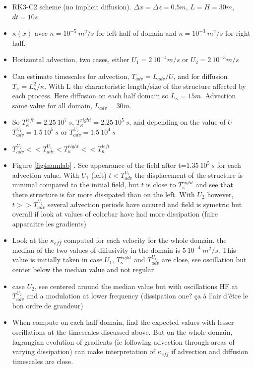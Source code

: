 \begin{itemize}
\item RK3-C2 scheme (no implicit diffusion). $\Delta x = \Delta z = 0.5m$, $L = H = 30m$, $dt=10s$
\item $\kappa(x)$ avec $\kappa = 10^{-5} \ m^2/s$ for left half of domain and $\kappa = 10^{-3} \ m^2/s$ for right half. 
\item Horizontal advection, two cases, either $U_1=2 \ 10^{-4} m/s $ or $U_2=2 \ 10^{-3} m/s $
\item Can estimate timescales for advection, $T_{adv}=L_{adv}/U$, and for diffusion $T_{\kappa}=L_{\kappa}^2/{\kappa}$. With L the characteristic length/size of the structure affected by each process. Here diffusion on each half domain so $L_{\kappa}=15m$. Advection same value for all domain, $L_{adv}=30m$.
\item So $T_{\kappa}^{left}=2.25 \ 10^7 \ s$, $T_{\kappa}^{right}=2.25 \ 10^5 \ s$, and depending on the value of $U$ $T_{adv}^{U_1}=1.5 \ 10^5 \ s$ or $T_{adv}^{U_2}=1.5 \ 10^4 \ s$
\item $T_{adv}^{U_2}<<T_{adv}^{U_1}<T_{\kappa}^{right}<<T_{\kappa}^{left}$
\item Figure \ref{fig4numlab} . See appearance of the field after t=$1.35 \ 10^5 \ s$ for each advection value. With $U_1$ (left) $t<T_{adv}^{U_1}$ the displacement of the structure is minimal compared to the initial field, but $t$ is close to $T_{\kappa}^{right}$ and see that there structure is far more dissipated than on the left. With $U_2$ however, $t>>T_{adv}^{U_2}$ several advection periods have occured and field is symetric but overall if look at values of colorbar have had more dissipation (faire apparaitre les gradients)
\item  Look at the $\kappa_{eff}$ computed for each velocity for the whole domain. the median of the two values of diffusivity in the domain is $5 \ 10^{-4} \ m^2/s$. This value is initially taken in case $U_1$, $T_{\kappa}^{right}$ and $T_{adv}^{U_1}$ are close, see oscillation but center below the median value and not regular%
\item case $U_2$, see centered around the median value but with oscillations HF at $T_{adv}^{U_2}$ and a modulation at lower frequency (dissipation one? ça à l'air d'être le bon ordre de grandeur)
\item When compute on each half domain, find the expected values with lesser oscillations at the timescales discussed above. But on the whole domain, lagrangian evolution of gradients (ie following advection through areas of varying dissipation) can make interpretation of $\kappa_{eff}$ if advection and diffusion timescales are close. 
\end{itemize}



